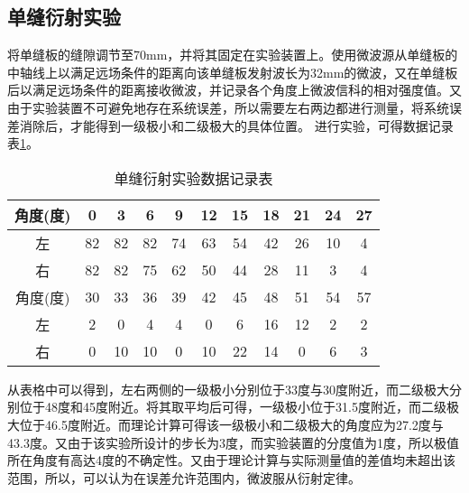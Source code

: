 \documentclass{article}
\begin{document}
\begin{CJK}{UTF8}{gkai}
\subsection{单缝衍射实验}
将单缝板的缝隙调节至70mm，并将其固定在实验装置上。使用微波源从单缝板的中轴线上以满足远场条件的距离向该单缝板发射波长为32mm的微波，又在单缝板后以满足远场条件的距离接收微波，并记录各个角度上微波信科的相对强度值。又由于实验装置不可避免地存在系统误差，所以需要左右两边都进行测量，将系统误差消除后，才能得到一级极小和二级极大的具体位置。
进行实验，可得数据记录表\ref{t2.0}。
\begin{table}[!htbp]
\centering
  \caption{单缝衍射实验数据记录表}
  \label{t2.0}
  \begin{tabular}{|c|c|c|c|c|c|c|c|c|c|c|}
    \hline
    角度(度)&0&3&6&9&12&15&18&21&24&27\\
    \hline
    左&82&82&82&74&63&54&42&26&10&4\\
    \hline
    右&82&82&75&62&50&44&28&11&3&4\\
    \hline
    角度(度)&30&33&36&39&42&45&48&51&54&57\\
    \hline
    左&2&0&4&4&0&6&16&12&2&2\\
    \hline
    右&0&10&10&0&10&22&14&0&6&3\\
    \hline
  \end{tabular}
\end{table}

从表格中可以得到，左右两侧的一级极小分别位于33度与30度附近，而二级极大分别位于48度和45度附近。将其取平均后可得，一级极小位于31.5度附近，而二级极大位于46.5度附近。而理论计算可得该一级极小和二级极大的角度应为27.2度与43.3度。又由于该实验所设计的步长为3度，而实验装置的分度值为1度，所以极值所在角度有高达4度的不确定性。又由于理论计算与实际测量值的差值均未超出该范围，所以，可以认为在误差允许范围内，微波服从衍射定律。


\end{CJK}
\end{document}
